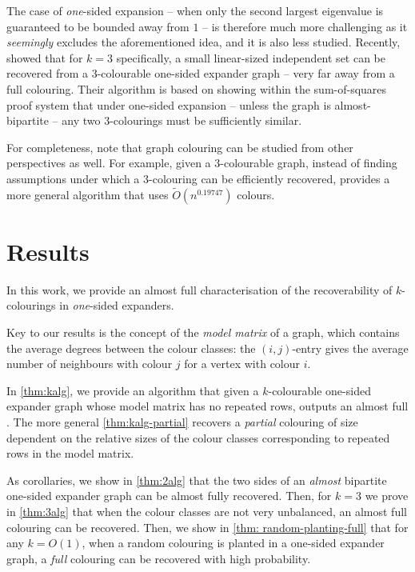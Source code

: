 The case of \textit{one}-sided expansion -- when only the second largest eigenvalue is guaranteed to be bounded away from \(1\) -- is therefore much more challenging as it \textit{seemingly} excludes the aforementioned idea, and it is also less studied. Recently, \cite{bafna-hsieh-kothari} showed that for $k=3$ specifically, a small linear-sized independent set can be recovered from a $3$-colourable one-sided expander graph -- very far away from a full colouring. Their algorithm is based on showing within the sum-of-squares proof system \cite{MR3727623} that under one-sided expansion -- unless the graph is almost-bipartite -- any two $3$-colourings must be sufficiently similar.

For completeness, note that graph colouring can be studied from other perspectives as well. For example, given a $3$-colourable graph, instead of finding assumptions under which a $3$-colouring can be efficiently recovered, \cite{MR4764817-24} provides a more general algorithm that uses $\tilde{O}(n^{0.19747})$ colours.

\section{Results}

In this work, we provide an almost full characterisation of the recoverability of $k$-colourings in \textit{one}-sided expanders.

Key to our results is the concept of the \textit{model matrix} of a graph, which contains the average degrees between the colour classes: the $(i, j)$-entry gives the average number of neighbours with colour $j$ for a vertex with colour $i$.

In \cref{thm:kalg}, we provide an algorithm that given a $k$-colourable one-sided expander graph whose model matrix has no repeated rows, outputs an almost full \kcl. The more general \cref{thm:kalg-partial} recovers a \textit{partial} colouring of size dependent on the relative sizes of the colour classes corresponding to repeated rows in the model matrix.

As corollaries, we show in \cref{thm:2alg} that the two sides of an \textit{almost} bipartite one-sided expander graph can be almost fully recovered. Then, for $k=3$ we prove in \cref{thm:3alg} that when the colour classes are not very unbalanced, an almost full colouring can be recovered. Then, we show in \cref{thm: random-planting-full} that for any $k=O(1)$, when a random colouring is planted in a one-sided expander graph, a \textit{full} colouring can be recovered with high probability.

